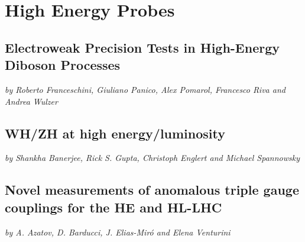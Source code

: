 \documentclass[../report.tex]{subfiles}
\providecommand{\main}{..}
\begin{document}
\section{High Energy Probes}
\label{sec4}






\subsection{Electroweak Precision Tests  in High-Energy Diboson Processes} \label{WZlong}
\begin{center}
{\it by Roberto Franceschini,  Giuliano Panico,  Alex Pomarol,
  Francesco Riva  and Andrea Wulzer}
\end{center}






\subsection{WH/ZH at high energy/luminosity}\label{sec:ZHWZeft}
\begin{center}
{\it by Shankha Banerjee,  Rick S. Gupta,  Christoph Englert and Michael Spannowsky}
\end{center}





\subsection{Novel measurements of anomalous triple gauge couplings for the HE and HL-LHC} \label{sec:WZtrans}
\begin{center}
{\it by A. Azatov, D. Barducci, J. Elias-Mir\'o and Elena Venturini}
\end{center}

\end{document}
